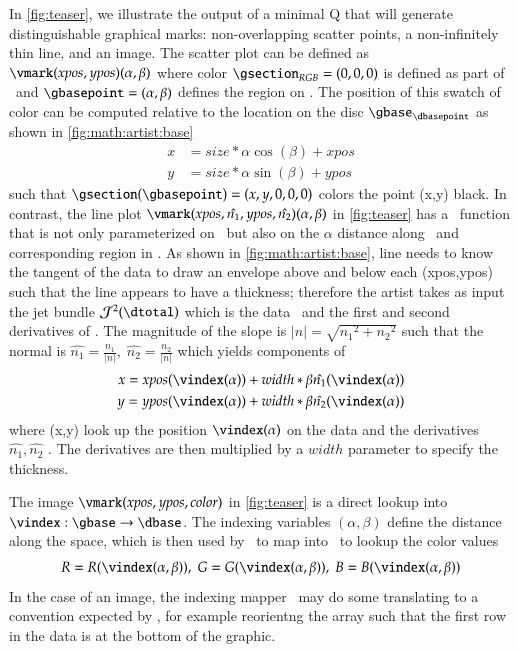 \documentclass[journal]{vgtc}                %
\begin{document}
In \autoref{fig:teaser}, we illustrate the output of a minimal Q that will generate distinguishable graphical marks: non-overlapping scatter points, a non-infinitely thin line, and an image. The scatter plot can be defined as $\vmark(xpos, ypos)(\alpha, \beta)$ where color $\gsection_{RGB} = (0,0,0)$ is defined as part of \vmark\ and $\gbasepoint=(\alpha, \beta)$ defines the region on \gbase. The position of this swatch of color can be computed relative to the location on the disc $\gbase_{\dbasepoint}$ as shown in \autoref{fig:math:artist:base}
\begin{align*}
x &= size *\alpha \cos(\beta) + xpos \\
y &= size *\alpha \sin(\beta) + ypos
\end{align*}
such that $\gsection(\gbasepoint) = (x, y, 0, 0, 0)$ colors the point (x,y) black. In contrast, the line plot $\vmark(xpos, \hat{n_{1}}, ypos, \hat{n_{2}})(\alpha, \beta)$ in \autoref{fig:teaser} has a \vindex\ function that is not only parameterized on \dbasepoint\ but also on the $\alpha$ distance along \dbasepoint\ and corresponding region in \gbase. As shown in \autoref{fig:math:artist:base}, line needs to know the tangent of the data to draw an envelope above and below each (xpos,ypos) such that the line appears to have a thickness; therefore the artist takes as input the jet bundle \cite{JetBundle2020,musilovaCalculusVariationsJet2016} $\mathcal{J}^{2}(\dtotal)$ which is the data \dtotal\ and the first and second derivatives of \dtotal. The magnitude of the slope is $\lvert n \rvert = \sqrt{{n_{1}}^2 + {n_{2}}^2}$
such that the normal is  $\hat{n_{1}} = \frac{n_1}{\lvert n \rvert}, \; \hat{n_{2}} = \frac{n_2}{\lvert n \rvert}$ which yields components of \gsection\
\begin{align*}
 x = xpos(\vindex(\alpha)) &+ width*\beta\hat{n_1}(\vindex(\alpha)) \\
 y = ypos(\vindex(\alpha)) &+ width*\beta\hat{n_2}(\vindex(\alpha)) 
\end{align*}
where (x,y) look up the position $\vindex(\alpha)$ on the data and the derivatives $\hat{n_1}, \hat{n_2}$ . The derivatives are then multiplied by a $width$ parameter to specify the thickness.

The image $\vmark(xpos, ypos, color)$ in \autoref{fig:teaser} is a direct lookup into  $\vindex:\gbase\rightarrow\dbase$. The indexing variables $(\alpha, \beta)$ define the distance along the space, which is then used by \vindex\ to map into \dbase\ to lookup the color values 
\begin{equation*}
R = R(\vindex(\alpha, \beta)), \; G = G(\vindex(\alpha, \beta)), \; B = B(\vindex(\alpha, \beta))
\end{equation*}
In the case of an image, the indexing mapper \vindex\ may do some translating to a convention expected by \vmark, for example reorientng the array such that the first row in the data is at the bottom of the graphic. 
\end{document}
